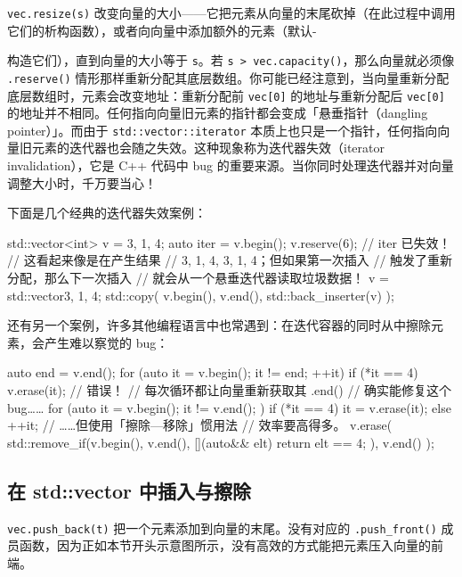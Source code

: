 \texttt{vec.\allowbreak{}resize(\allowbreak{}s)\allowbreak{}} 改变向量的大小——它把元素从向量的末尾砍掉（在此过程中调用它们的析构函数），或者向向量中添加额外的元素（默认-

构造它们），直到向量的大小等于 \texttt{s}。若 \texttt{s > vec.\allowbreak{}capacity(\allowbreak{})\allowbreak{}}，那么向量就必须像 \texttt{.reserve(\allowbreak{})\allowbreak{}} 情形那样重新分配其底层数组。你可能已经注意到，当向量重新分配底层数组时，元素会改变地址：重新分配前 \texttt{vec[0]} 的地址与重新分配后 \texttt{vec[0]} 的地址并不相同。任何指向向量旧元素的指针都会变成「悬垂指针（dangling pointer）」。而由于 \texttt{std::\allowbreak{}vector::\allowbreak{}iterator} 本质上也只是一个指针，任何指向向量旧元素的迭代器也会随之失效。这种现象称为迭代器失效（iterator invalidation），它是 C++ 代码中 bug 的重要来源。当你同时处理迭代器并对向量调整大小时，千万要当心！

下面是几个经典的迭代器失效案例：

\begin{codebox}[cpp]
    std::vector<int> v = {3, 1, 4};
    auto iter = v.begin();
    v.reserve(6); // iter 已失效！
    // 这看起来像是在产生结果
    // {3, 1, 4, 3, 1, 4}；但如果第一次插入
    // 触发了重新分配，那么下一次插入
    // 就会从一个悬垂迭代器读取垃圾数据！
    v = std::vector{3, 1, 4};
    std::copy(
      v.begin(),
      v.end(),
      std::back_inserter(v)
    );
\end{codebox}

还有另一个案例，许多其他编程语言中也常遇到：在迭代容器的同时从中擦除元素，会产生难以察觉的 bug：

\begin{codebox}[cpp]
    auto end = v.end();
    for (auto it = v.begin(); it != end; ++it) {
      if (*it == 4) {
        v.erase(it); // 错误！
      }
    }
    // 每次循环都让向量重新获取其 .end()
    // 确实能修复这个 bug……
    for (auto it = v.begin(); it != v.end(); ) {
      if (*it == 4) {
        it = v.erase(it);
      } else {
        ++it;
      }
    }
    // ……但使用「擦除—移除」惯用法
    // 效率要高得多。
    v.erase(
      std::remove_if(v.begin(), v.end(), [](auto&& elt) {
        return elt == 4;
      }),
      v.end()
    );
\end{codebox}

\subsection{在 std::vector 中插入与擦除}

\texttt{vec.\allowbreak{}push\_\allowbreak{}back(\allowbreak{}t)\allowbreak{}} 把一个元素添加到向量的末尾。没有对应的 \texttt{.push\_\allowbreak{}front(\allowbreak{})\allowbreak{}} 成员函数，因为正如本节开头示意图所示，没有高效的方式能把元素压入向量的前端。


